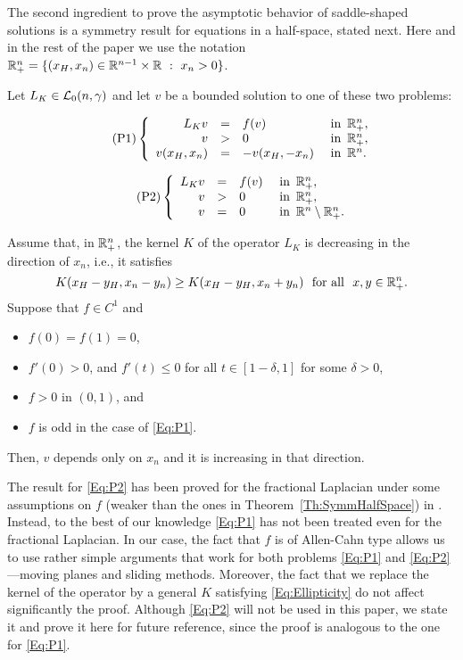 The second ingredient to prove the asymptotic behavior of saddle-shaped solutions is a symmetry result for equations in a half-space, stated next. Here and in the rest of the paper we use the notation $\mathbb{R}^n_+= \{(x_H,x_n)\in \mathbb{R}^{n-1}\times \mathbb{R} \ : \ x_n > 0\}$.  

\begin{theorem}
	\label{Th:SymmHalfSpace}
	Let $L_K\in \mathcal{L}_0(n,\gamma)$ and let $v$ be a bounded solution to one of these two problems:
	
	\begin{equation}
	\reqnomode
	\tag{P1}
	\label{Eq:P1}
	\beqc{\PDEsystem}
	L_K v &=& f(v)   &\textrm{ in } \,\R^n_+,\\
	v &>& 0   &\textrm{ in } \,\R^n_+,\\
	v(x_H,x_n) &=& -v(x_H,-x_n)   &\textrm{ in } \,\R^n.
	\eeqc
	\end{equation}
	
	\begin{equation}
	\reqnomode
	\tag{P2}
	\label{Eq:P2}
	\beqc{\PDEsystem}
	L_K v &=& f(v)   &\textrm{ in } \,\R^n_+,\\
	v &>& 0   &\textrm{ in } \,\R^n_+,\\
	v &=& 0   &\textrm{ in } \,\R^n \setminus \R^n_+.
	\eeqc
	\end{equation}
	
	\reqnomode
	
	Assume that, in $\mathbb{R}^n_+$, the kernel $K$ of the operator $L_K$ is decreasing in the direction of $x_n$, i.e., it satisfies
	$$
	K(x_H-y_H,x_n-y_n) \geq K(x_H-y_H,x_n+y_n) \,\,\,\,\text{for all } \,\, x,y\in \mathbb{R}^n_+.
	$$ 
	Suppose that $f\in C^1$ and
	\begin{itemize}
		\item $f(0) = f(1) = 0$,
		\item $f'(0)>0$, and $f'(t)\leq 0$ for all $t\in[1-\delta,1]$ for some $\delta>0$,
		\item $f>0$ in $(0,1)$, and
		\item $f$ is odd in the case of \eqref{Eq:P1}.
	\end{itemize}
	Then, $v$ depends only on $x_n$ and it is increasing in that direction.
\end{theorem}

The result for \eqref{Eq:P2} has been proved for the fractional Laplacian under some assumptions on $f$ (weaker than the ones in Theorem~\ref{Th:SymmHalfSpace}) in \cite{QuaasXia, BarriosEtAl-Monotonicity, BarriosEtAl-Symmetry, FallWethMonotonicity}. Instead, to the best of our knowledge \eqref{Eq:P1} has not been treated even for the fractional Laplacian. In our case, the fact that $f$ is of Allen-Cahn type allows us to use rather simple arguments that work for both problems \eqref{Eq:P1} and \eqref{Eq:P2} ---moving planes and sliding methods. Moreover, the fact that we replace the kernel of the operator by a general $K$ satisfying \eqref{Eq:Ellipticity} do not affect significantly the proof. Although \eqref{Eq:P2} will not be used in this paper, we state it and prove it here for future reference, since the proof is analogous to the one for \eqref{Eq:P1}.

